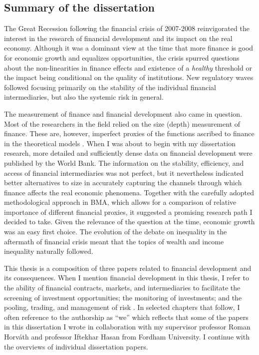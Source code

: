 \begin{refsection}
\chapter{Summary of the dissertation}
\label{ch1}
The Great Recession following the financial crisis of 2007-2008 reinvigorated the interest in the research of financial development and its impact on the real economy. Although it was a dominant view at the time that more finance is good for economic growth and equalizes opportunities, the crisis spurred questions about the non-linearities in finance effects and existence of a \emph{healthy} threshold or the impact being conditional on the quality of institutions. New regulatory waves followed focusing primarily on the stability of the individual financial intermediaries, but also the systemic risk in general. 

The measurement of finance and financial development also came in question. Most of the researchers in the field relied on the size (depth) measurement of finance. These are, however, imperfect proxies of the functions ascribed to finance in the theoretical models \parencite{Levine2005}. When I was about to begin with my dissertation research, more detailed and sufficiently dense data on financial development were published by the World Bank. The information on the stability, efficiency, and access of financial intermediaries was not perfect, but it nevertheless indicated better alternatives to size in accurately capturing the channels through which finance affects the real economic phenomena. Together with the carefully adopted methodological approach in \ac{BMA}, which allows for a comparison of relative importance of different financial proxies, it suggested a promising research path I decided to take. Given the relevance of the question at the time, economic growth was an easy first choice. The evolution of the debate on inequality in the aftermath of financial crisis meant that the topics of wealth and income inequality naturally followed.

This thesis is a composition of three papers related to financial development and its consequences. When I mention financial development in this thesis, I refer to the ability of financial contracts, markets, and intermediaries to facilitate the screening of investment opportunities; the monitoring of investments; and the pooling, trading, and management of risk \parencite{demirgucc2009finance}. In selected chapters that follow, I often reference to the authorship as ``we'' which reflects that some of the papers in this dissertation I wrote in collaboration with my supervisor professor Roman Horv\'{a}th and professor Iftekhar Hasan from Fordham University. I continue with the overviews of individual dissertation papers.


\end{refsection}
